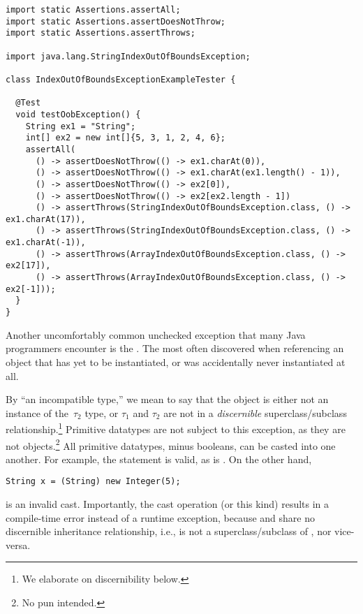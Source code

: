 \begin{lstlisting}[language=MyJava]
import static Assertions.assertAll;
import static Assertions.assertDoesNotThrow;
import static Assertions.assertThrows;

import java.lang.StringIndexOutOfBoundsException;

class IndexOutOfBoundsExceptionExampleTester {

  @Test
  void testOobException() {
    String ex1 = "String";
    int[] ex2 = new int[]{5, 3, 1, 2, 4, 6}; 
    assertAll(
      () -> assertDoesNotThrow(() -> ex1.charAt(0)),
      () -> assertDoesNotThrow(() -> ex1.charAt(ex1.length() - 1)),
      () -> assertDoesNotThrow(() -> ex2[0]),
      () -> assertDoesNotThrow(() -> ex2[ex2.length - 1])
      () -> assertThrows(StringIndexOutOfBoundsException.class, () -> ex1.charAt(17)),
      () -> assertThrows(StringIndexOutOfBoundsException.class, () -> ex1.charAt(-1)),
      () -> assertThrows(ArrayIndexOutOfBoundsException.class, () -> ex2[17]),
      () -> assertThrows(ArrayIndexOutOfBoundsException.class, () -> ex2[-1]));
  } 
}
\end{lstlisting} 

Another uncomfortably common unchecked exception that many Java programmers encounter is the . 
The  most often discovered when referencing an object that has yet to be instantiated, or was accidentally never instantiated at all.

By ``an incompatible type,'' we mean to say that the object is either not an instance of the~$\tau_2$ type, or $\tau_1$ and $\tau_2$ are not in a \emph{discernible} superclass/subclass relationship.\footnote{We elaborate on discernibility below.}
Primitive datatypes are not subject to this exception, as they are not objects.\footnote{No pun intended.} 
All primitive datatypes, minus booleans, can be casted into one another. For example, the statement  is valid, as is . 
On the other hand,

\begin{small}
\begin{verbatim}
String x = (String) new Integer(5);
\end{verbatim}
\end{small} 

is an invalid cast. Importantly, the cast operation (or this kind) results in a compile-time error instead of a runtime exception, because  and  share no discernible inheritance relationship, i.e.,  is not a superclass/subclass of , nor vice-versa.

